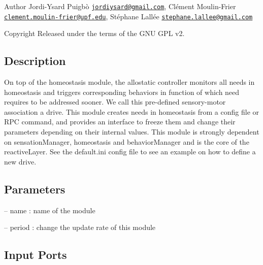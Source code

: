 \begin{DoxyAuthor}{Author}
Jordi-\/\+Ysard Puigbò \href{mailto:jordiysard@gmail.com}{\tt jordiysard@gmail.\+com}, Clément Moulin-\/\+Frier \href{mailto:clement.moulin-frier@upf.edu}{\tt clement.\+moulin-\/frier@upf.\+edu}, Stéphane Lallée \href{mailto:stephane.lallee@gmail.com}{\tt stephane.\+lallee@gmail.\+com} ~\newline
 
\end{DoxyAuthor}
\begin{DoxyCopyright}{Copyright}
Released under the terms of the G\+NU G\+PL v2. 
\end{DoxyCopyright}
\hypertarget{group__touchDetector_intro_sec}{}\subsection{Description}\label{group__touchDetector_intro_sec}
On top of the homeostasis module, the allostatic controller monitors all needs in homeostasis and triggers corresponding behaviors in function of which need requires to be addressed sooner. We call this pre-\/defined sensory-\/motor association a drive. This module creates needs in homeostasis from a config file or R\+PC command, and provides an interface to freeze them and change their parameters depending on their internal values. This module is strongly dependent on sensation\+Manager, homeostasis and behavior\+Manager and is the core of the reactive\+Layer. See the default.\+ini config file to see an example on how to define a new drive.\hypertarget{group__touchDetector_parameters_sec}{}\subsection{Parameters}\label{group__touchDetector_parameters_sec}

\begin{DoxyItemize}
\item -- name \+: name of the module
\item -- period \+: change the update rate of this module 
\end{DoxyItemize}\hypertarget{group__touchDetector_inputports_sec}{}\subsection{Input Ports}\label{group__touchDetector_inputports_sec}


